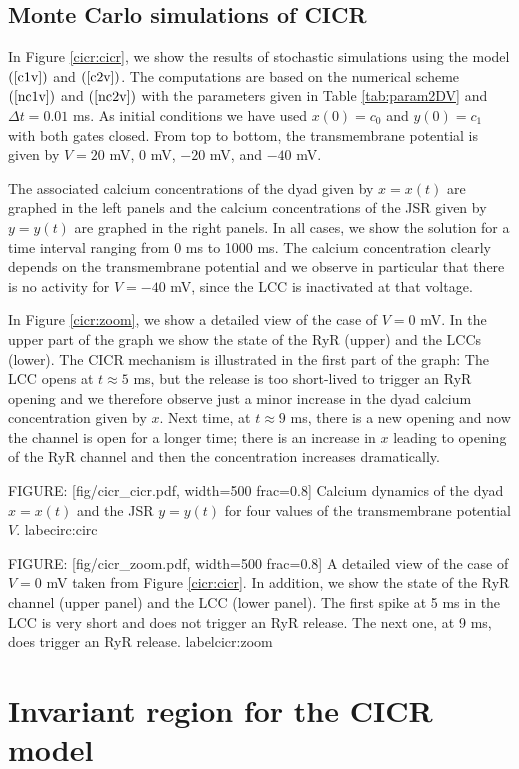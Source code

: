 \subsection{Monte Carlo simulations of CICR}

In Figure \ref{cicr:cicr}, we show the results of stochastic simulations
using the model $(\ref{c1v})$ and $(\ref{c2v}) $.
The computations are based on the numerical scheme
$(\ref{nc1v})$  and $(\ref{nc2v}) $ with the parameters given in Table \ref{tab:param2DV} and $\Delta t=0.01$ ms. As initial conditions we have used $x(0) = c_0$ and $y(0) = c_1$ with both gates closed.
From top to bottom, the transmembrane potential is given by $V=20$ mV, $0$ mV, $-20$ mV, and $-40$ mV.

The associated calcium concentrations of the dyad given by $x=x(t)$ are graphed in the left panels and the
calcium concentrations of the JSR given by $y=y(t)$ are graphed in the right panels.
In all cases, we show the solution for a time interval ranging from 0 ms to 1000 ms.
The calcium concentration clearly depends on the transmembrane potential and we observe in particular that there
is no activity for $V=-40$ mV, since the LCC is inactivated at that voltage.

In Figure \ref{cicr:zoom}, we show a detailed view of the case of $V=0$ mV.
In the upper part of the graph we show the state
of the RyR (upper) and the LCCs (lower). The CICR mechanism is illustrated in the first part of the graph: The LCC opens at $t \approx 5$ ms, but the release is too short-lived to trigger an RyR opening and we therefore observe just a minor increase in the dyad calcium concentration given by  $x$. Next time, at
$t \approx 9$ ms, there is a new opening and now the channel is open for a longer time;
there is an increase in $x$ leading to opening of the RyR channel and then the concentration increases dramatically.

FIGURE: [fig/cicr_cicr.pdf, width=500 frac=0.8] Calcium dynamics of the dyad $x=x(t)$ and the JSR $y=y(t)$ for four values of the transmembrane potential $V$. labe{circ:circ}

FIGURE: [fig/cicr_zoom.pdf, width=500 frac=0.8] A detailed view of the case of $V=0$ mV taken from Figure \ref{cicr:cicr}. In addition, we show the state of the RyR channel (upper panel) and the LCC (lower panel). The first spike at 5 ms in the LCC is very short and does not trigger an RyR release. The next one, at 9 ms, does trigger an RyR release. label{cicr:zoom}

\section{Invariant region for the CICR model}

